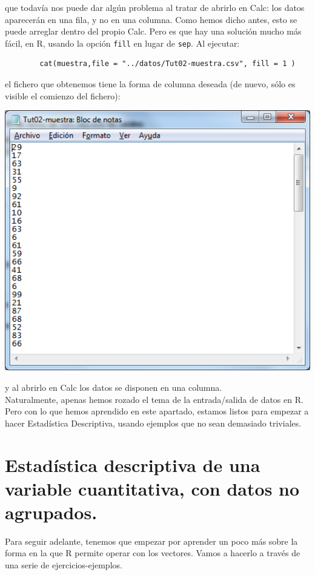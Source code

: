\documentclass[10pt,a4paper]{article}\usepackage[]{graphicx}\usepackage[]{color}
\begin{document}
que todavía nos puede dar algún problema al tratar de abrirlo en Calc: los datos aparecerán en una fila, y no en una columna. Como hemos dicho antes, esto se puede arreglar dentro del propio Calc. Pero es que hay una solución mucho más fácil, en R, usando la opción {\tt fill} en lugar de {\tt sep}. Al ejecutar:
\begin{verbatim}
        cat(muestra,file = "../datos/Tut02-muestra.csv", fill = 1 )
\end{verbatim}
el fichero que obtenemos tiene la forma de columna deseada (de nuevo, sólo es visible el comienzo del fichero):
    \begin{center}
    \includegraphics[width=14cm]{../fig/Tut02-14.png}
    \end{center}
y al abrirlo en Calc los datos se disponen en una columna.\\

Naturalmente, apenas hemos rozado el tema de la entrada/salida de datos en R. Pero con lo que hemos aprendido en este apartado, estamos listos para empezar a hacer Estadística Descriptiva, usando ejemplos que no sean demasiado triviales.

\section{Estadística descriptiva de una variable cuantitativa, con datos no agrupados.}
\label{tut03:sec:EstadisticaDescriptivaVariableCuantitativaConR}

Para seguir adelante, tenemos que empezar por aprender un poco más sobre la forma en la que R permite operar con los vectores. Vamos a hacerlo a través de una serie de ejercicios-ejemplos.
\end{document}
